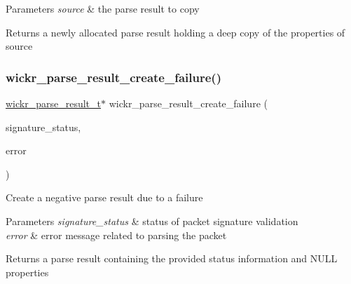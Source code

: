 \begin{DoxyParams}{Parameters}
{\em source} & the parse result to copy \\
\hline
\end{DoxyParams}
\begin{DoxyReturn}{Returns}
a newly allocated parse result holding a deep copy of the properties of \textquotesingle{}source\textquotesingle{} 
\end{DoxyReturn}
\mbox{\label{group__wickr__protocol_gac2673bcfeae2f8d693e523809bb6bb30}} 
\subsubsection{\texorpdfstring{wickr\+\_\+parse\+\_\+result\+\_\+create\+\_\+failure()}{wickr\_parse\_result\_create\_failure()}}
{\footnotesize\ttfamily \mbox{\hyperlink{structwickr__parse__result}{wickr\+\_\+parse\+\_\+result\+\_\+t}}$\ast$ wickr\+\_\+parse\+\_\+result\+\_\+create\+\_\+failure (\begin{DoxyParamCaption}\item[{wickr\+\_\+packet\+\_\+signature\+\_\+status}]{signature\+\_\+status,  }\item[{wickr\+\_\+decode\+\_\+error}]{error }\end{DoxyParamCaption})}

Create a negative parse result due to a failure


\begin{DoxyParams}{Parameters}
{\em signature\+\_\+status} & status of packet signature validation \\
\hline
{\em error} & error message related to parsing the packet \\
\hline
\end{DoxyParams}
\begin{DoxyReturn}{Returns}
a parse result containing the provided status information and N\+U\+LL properties 
\end{DoxyReturn}
\mbox{\label{group__wickr__protocol_ga7bd98225a92620e1aa5940cf59fdbedf}} 

